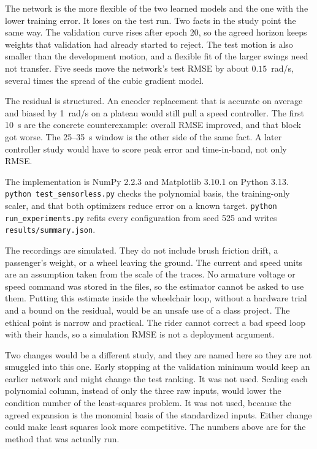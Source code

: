 \documentclass[conference]{IEEEtran}
\begin{document}
The network is the more flexible of the two learned models and the one with the lower training error. It loses on the test run. Two facts in the study point the same way. The validation curve rises after epoch 20, so the agreed horizon keeps weights that validation had already started to reject. The test motion is also smaller than the development motion, and a flexible fit of the larger swings need not transfer. Five seeds move the network's test RMSE by about $0.15$~rad/s, several times the spread of the cubic gradient model.

The residual is structured. An encoder replacement that is accurate on average and biased by 1~rad/s on a plateau would still pull a speed controller. The first 10~s are the concrete counterexample: overall RMSE improved, and that block got worse. The 25--35~s window is the other side of the same fact. A later controller study would have to score peak error and time-in-band, not only RMSE.

The implementation is NumPy 2.2.3 and Matplotlib 3.10.1 on Python 3.13. \texttt{python test\_sensorless.py} checks the polynomial basis, the training-only scaler, and that both optimizers reduce error on a known target. \texttt{python run\_experiments.py} refits every configuration from seed 525 and writes \texttt{results/summary.json}.

The recordings are simulated. They do not include brush friction drift, a passenger's weight, or a wheel leaving the ground. The current and speed units are an assumption taken from the scale of the traces. No armature voltage or speed command was stored in the files, so the estimator cannot be asked to use them. Putting this estimate inside the wheelchair loop, without a hardware trial and a bound on the residual, would be an unsafe use of a class project. The ethical point is narrow and practical. The rider cannot correct a bad speed loop with their hands, so a simulation RMSE is not a deployment argument.

Two changes would be a different study, and they are named here so they are not smuggled into this one. Early stopping at the validation minimum would keep an earlier network and might change the test ranking. It was not used. Scaling each polynomial column, instead of only the three raw inputs, would lower the condition number of the least-squares problem. It was not used, because the agreed expansion is the monomial basis of the standardized inputs. Either change could make least squares look more competitive. The numbers above are for the method that was actually run.
\end{document}
